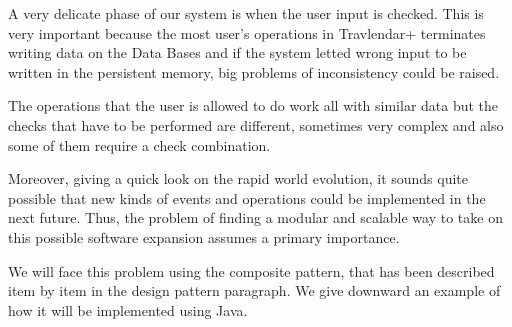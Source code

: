 A very delicate phase of our system is when the user input is checked. This is very important because the most user’s operations in Travlendar+ terminates writing data on the Data Bases and if the system letted wrong input to be written in the persistent memory, big problems of inconsistency could be raised.

The operations that the user is allowed to do work all with similar data but the checks that have to be performed are different, sometimes very complex and also some of them require a check combination.

Moreover, giving a quick look on the rapid world evolution, it sounds quite possible that new kinds of events and operations could be implemented in the next future. Thus, the problem of finding a modular and scalable way to take on this possible software expansion assumes a primary importance.

We will face this problem using the composite pattern, that has been described item by item in the design pattern paragraph. We give downward an example of how it will be implemented using Java.



\newpage
{}




\newpage
{}




\newpage
{}
